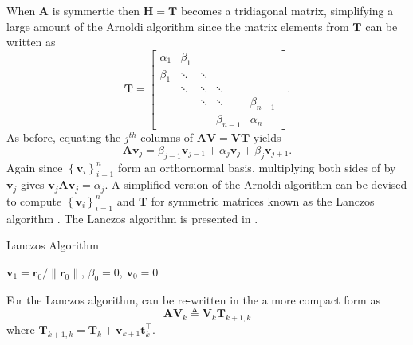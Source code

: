 When $\bm{A}$ is symmertic then $\bm{H} = \bm{T}$ becomes a tridiagonal matrix, simplifying a large amount of the Arnoldi algorithm since the matrix elements from $\bm{T}$ can be written as
\[
    \bm{T} =
    \begin{bmatrix}
        \alpha_1 & \beta_1 &        &             &             \\
        \beta_1  & \ddots  & \ddots &             &             \\
                 & \ddots  & \ddots & \ddots      &             \\
                 &         & \ddots & \ddots      & \beta_{n-1} \\
                 &         &        & \beta_{n-1} & \alpha_{n}
    \end{bmatrix}.
\]
As before, equating the $j^{th}$ columns of $\bm{A} \bm{V} = \bm{V} \bm{T}$ yields
\begin{equation}\label{eq: lancz_orth_basis}
    \bm{A} \bm{v}_{j} = \beta_{j-1} \bm{v}_{j-1} + \alpha_{j} \bm{v}_j + \beta_j \bm{v}_{j+1}.
\end{equation}
Again since $\left\{ \bm{v}_{i} \right\}_{i=1}^{n}$ form an orthornormal basis, multiplying both sides of  by $\bm{v}_j$ gives $\bm{v}_j \bm{A} \bm{v}_j = \alpha_j$. A simplified version of the Arnoldi algorithm can be devised to compute $\left\{ \bm{v}_{i} \right\}_{i=1}^{n}$ and $\bm{T}$ for symmetric matrices known as the Lanczos algorithm \cite{DemmelJamesW1997Anla}. The Lanczos algorithm is presented in .

{\centering
\begin{minipage}{.85\linewidth}
    \begin{algorithm}[H]
        \caption{Lanczos Algorithm}
        \label{alg: Lanczos_Algorithm}
        \SetAlgoLined
        \DontPrintSemicolon

        \BlankLine
        $\bm{v}_1 = \bm{r}_0 / \| \bm{r}_0 \|$, $\beta_0 = 0$, $\bm{v}_0 = 0$\;
        \BlankLine
    \end{algorithm}
\end{minipage}
\par
}

For the Lanczos algorithm,  can be re-written in the a more compact form as
\begin{equation}\label{eq: AVk_eq_VkTk1k}
    \bm{A} \bm{V}_{k} \triangleq \bm{V}_{k} \bm{T}_{k+1,k}
\end{equation}
where $\bm{T}_{k+1,k} = \bm{T}_{k} + \bm{v}_{k+1} \bm{t}_{k}^{\intercal}$.